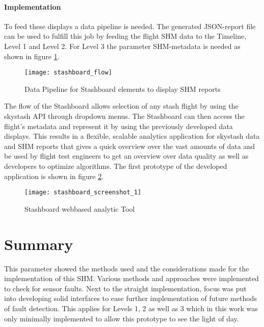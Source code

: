 \paragraph{Implementation}
To feed these displays a data pipeline is needed. The generated JSON-report file can be used to fulfill this job by feeding the flight SHM data to the Timeline, Level 1 and Level 2. For Level 3 the parameter SHM-metadata is needed as shown in figure \ref{fig:stashboard_flow}.

\begin{figure}[!h]
    \centering
    \texttt{[image: stashboard\_flow]}
    \caption{Data Pipeline for Stashboard elements to display SHM reports}
    \label{fig:stashboard_flow}
\end{figure}

The flow of the Stashboard allows selection of any stash flight by using the skystash API through dropdown menus. The Stashboard can then access the flight's metadata and represent it by using the previously developed data displays.
This results in a flexible, scalable analytics application for skystash data and SHM reports that gives a quick overview over the vast amounts of data and be used by flight test engineers to get an overview over data quality as well as developers to optimize algorithms. The first prototype of the developed application is shown in figure \ref{fig:stashboard}.

\begin{figure}[!h]
    \centering
    \texttt{[image: stashboard\_screenshot\_1]}
    \caption{Stashboard webbased analytic Tool }
    \label{fig:stashboard}
\end{figure}


\newpage
\section{Summary}

This parameter showed the methods used and the considerations made for the implementation of this SHM. Various methods and approaches were implemented to check for sensor faults. Next to the straight implementation, focus was put into developing solid interfaces to ease further implementation of future methods of fault detection. This applies for Levels 1, 2 as well as 3 which in this work was only minimally implemented to allow this prototype to see the light of day.





